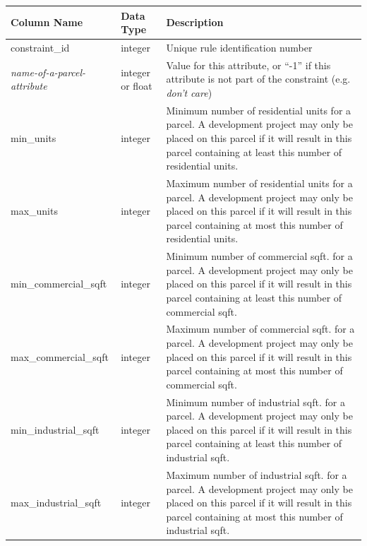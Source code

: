 \begin{tabular}{|l|l|p{3.5in}|}

\hline
\textbf{Column Name} & \textbf{Data Type} & \textbf{Description} \\

\hline constraint_id & integer & Unique rule identification number  \\

\hline \emph{name-of-a-parcel-attribute} & integer or float &  Value for this
attribute, or ``-1'' if this attribute is not part of the constraint (e.g.
\emph{don't care}) \\

\hline min_units & integer & Minimum number of residential units for a parcel.
A development project may only be placed on this parcel if it will result in
this parcel containing at least this number of residential units. \\

\hline max_units & integer & Maximum number of residential units for a parcel.
A development project may only be placed on this parcel if it will result in
this parcel containing at most this number of residential units. \\

\hline min_commercial_sqft & integer & Minimum number of commercial
sqft. for a parcel.  A development project may only be placed on
this parcel if it will
result in this parcel containing at least this number of commercial sqft. \\

\hline max_commercial_sqft & integer & Maximum number of commercial
sqft. for a parcel. A development project may only be placed on
this parcel if it will
result in this parcel containing at most this number of commercial sqft. \\

\hline min_industrial_sqft & integer & Minimum number of industrial
sqft. for a parcel.  A development project may only be placed on
this parcel if it will
result in this parcel containing at least this number of industrial sqft. \\

\hline max_industrial_sqft & integer & Maximum number of industrial
sqft. for a parcel. A development project may only be placed on
this parcel if it will
result in this parcel containing at most this number of industrial sqft. \\

\hline
\end{tabular}

